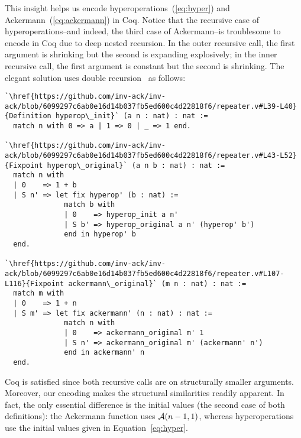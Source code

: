 This insight helps us encode hyperoperations~(\ref{eq:hyper}) and 
Ackermann~(\ref{eq:ackermann}) in Coq.  Notice that the recursive case of hyperoperations--and
indeed, the third case of Ackermann--is troublesome to encode in Coq due to
deep nested recursion.  In the outer recursive call, the first argument is shrinking
but the second is expanding explosively; in the inner recursive call, the first argument is
constant but the second is shrinking. The elegant solution uses double recursion~\cite{bertotcast} as follows:
\begin{lstlisting}
`\href{https://github.com/inv-ack/inv-ack/blob/6099297c6ab0e16d14b037fb5ed600c4d22818f6/repeater.v#L39-L40}{Definition hyperop\_init}` (a n : nat) : nat :=
  match n with 0 => a | 1 => 0 | _ => 1 end.

`\href{https://github.com/inv-ack/inv-ack/blob/6099297c6ab0e16d14b037fb5ed600c4d22818f6/repeater.v#L43-L52}{Fixpoint hyperop\_original}` (a n b : nat) : nat :=
  match n with
  | 0    => 1 + b
  | S n' => let fix hyperop' (b : nat) :=
              match b with
              | 0    => hyperop_init a n'
              | S b' => hyperop_original a n' (hyperop' b')
              end in hyperop' b
  end.

`\href{https://github.com/inv-ack/inv-ack/blob/6099297c6ab0e16d14b037fb5ed600c4d22818f6/repeater.v#L107-L116}{Fixpoint ackermann\_original}` (m n : nat) : nat :=
  match m with
  | 0    => 1 + n
  | S m' => let fix ackermann' (n : nat) : nat :=
              match n with
              | 0    => ackermann_original m' 1
              | S n' => ackermann_original m' (ackermann' n')
              end in ackermann' n 
  end.
\end{lstlisting}
Coq is satisfied since both recursive calls are on structurally smaller arguments.
Moreover, our encoding makes the structural similarities
 readily apparent.  In fact, the only essential difference is the initial values
(the second case of both definitions): the Ackermann function uses $\mathcal{A}(n-1,1)$, whereas
hyperoperations use the initial values given in Equation~\ref{eq:hyper}.

